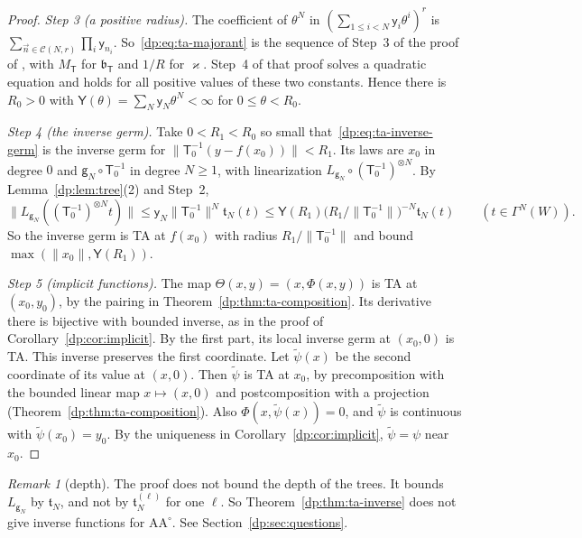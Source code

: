 \documentclass[11pt]{amsart}
\theoremstyle{definition}
\theoremstyle{remark}
\newtheorem{remark}[theorem]{Remark}
\numberwithin{equation}{section}
\newcommand{\norm}[1]{\lVert #1\rVert}
\theoremstyle{plain}
\theoremstyle{definition}
\theoremstyle{plain}
\begin{document}
\begin{proof}
\emph{Step 3 (a positive radius).} The coefficient of $\theta^N$ in $(\sum_{1\le i<N}\mathsf y_i\theta^i)^r$ is $\sum_{\vec n\in\mathcal C(N,r)}\prod_i\mathsf y_{n_i}$. So~\eqref{dp:eq:ta-majorant} is the sequence of Step~3 of the proof of \cite[Lemma~Q.14]{I}, with $M_{\mathsf T}$ for $\mathfrak b_{\mathsf T}$ and $1/R$ for $\varkappa$. Step~4 of that proof solves a quadratic equation and holds for all positive values of these two constants. Hence there is $R_0>0$ with $\mathsf Y(\theta)=\sum_N\mathsf y_N\theta^N<\infty$ for $0\le\theta<R_0$.

\emph{Step 4 (the inverse germ).} Take $0<R_1<R_0$ so small that~\eqref{dp:eq:ta-inverse-germ} is the inverse germ for $\norm{\mathsf T_0^{-1}(y-f(x_0))}<R_1$. Its laws are $x_0$ in degree $0$ and $\mathsf g_N\circ\mathsf T_0^{-1}$ in degree $N\ge1$, with linearization $L_{\mathsf g_N}\circ(\mathsf T_0^{-1})^{\otimes N}$. By Lemma~\ref{dp:lem:tree}(2) and Step~2,
\[
 \norm{L_{\mathsf g_N}((\mathsf T_0^{-1})^{\otimes N}t)}\le\mathsf y_N\norm{\mathsf T_0^{-1}}^N\mathfrak t_N(t)\le\mathsf Y(R_1)\bigl(R_1/\norm{\mathsf T_0^{-1}}\bigr)^{-N}\mathfrak t_N(t)\qquad(t\in\Gamma^N(W)).
\]
So the inverse germ is TA at $f(x_0)$ with radius $R_1/\norm{\mathsf T_0^{-1}}$ and bound $\max(\norm{x_0},\mathsf Y(R_1))$.

\emph{Step 5 (implicit functions).} The map $\Theta(x,y)=(x,\Phi(x,y))$ is TA at $(x_0,y_0)$, by the pairing in Theorem~\ref{dp:thm:ta-composition}. Its derivative there is bijective with bounded inverse, as in the proof of Corollary~\ref{dp:cor:implicit}. By the first part, its local inverse germ at $(x_0,0)$ is TA. This inverse preserves the first coordinate. Let $\tilde\psi(x)$ be the second coordinate of its value at $(x,0)$. Then $\tilde\psi$ is TA at $x_0$, by precomposition with the bounded linear map $x\mapsto(x,0)$ and postcomposition with a projection (Theorem~\ref{dp:thm:ta-composition}). Also $\Phi(x,\tilde\psi(x))=0$, and $\tilde\psi$ is continuous with $\tilde\psi(x_0)=y_0$. By the uniqueness in Corollary~\ref{dp:cor:implicit}, $\tilde\psi=\psi$ near $x_0$.
\end{proof}

\begin{remark}[depth]\label{dp:rem:ta-depth}
The proof does not bound the depth of the trees. It bounds $L_{\mathsf g_N}$ by $\mathfrak t_N$, and not by $\mathfrak t^{(\ell)}_N$ for one $\ell$. So Theorem~\ref{dp:thm:ta-inverse} does not give inverse functions for $\mathrm{AA}^\circ$. See Section~\ref{dp:sec:questions}.
\end{remark}
\end{document}

